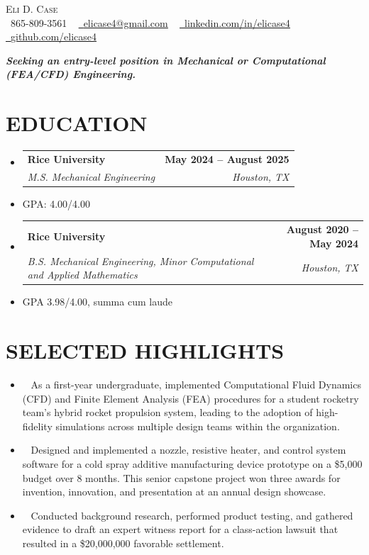 \documentclass[letterpaper,11pt]{article}
\makeatletter
\newcommand{\resumeItem}[1]{
  \item \small{
    {#1 \vspace{-2pt}}
  }
}
\newcommand{\highlightItem}[1]{
  \item \textendash\ \small{
    {#1 \vspace{-2pt}}
  }
}
\newcommand{\resumeSubheading}[4]{
  \vspace{-2pt}\item
    \begin{tabular*}{1.0\textwidth}[t]{l@{\extracolsep{\fill}}r}
      \textbf{#1} & \textbf{\small #2} \\
      \textit{\small#3} & \textit{\small #4} \\
    \end{tabular*}\vspace{-7pt}
}
\newcommand{\resumeSubHeadingListStart}{\begin{itemize}[leftmargin=0.0in, label={}]}
\newcommand{\resumeSubHeadingListEnd}{\end{itemize}}
\makeatother
\begin{document}
\begin{center}
    {\large \scshape Eli D. Case} \\ \vspace{1pt}
    \small \raisebox{-0.1\height}\faPhone\ 865-809-3561 ~ \href{mailto:elicase4@gmail.com}{\raisebox{-0.2\height}\faEnvelope\  \underline{elicase4@gmail.com}} ~ 
    \href{https://linkedin.com/in/elicase4}{\raisebox{-0.2\height}\faLinkedin\ \underline{linkedin.com/in/elicase4}}  ~
    \href{https://github.com/elicase4}{\raisebox{-0.2\height}\faGithub\ \underline{github.com/elicase4}}
\end{center}

\begin{center}
  \vspace{4pt}
  \textit{\textbf{Seeking an entry-level position in Mechanical or Computational (FEA/CFD) Engineering.}}
  \vspace{-2pt}
\end{center}

\section{EDUCATION}

  \resumeSubHeadingListStart
    
    \resumeSubheading
      {Rice University}{May 2024 -- August 2025}
      {M.S. Mechanical Engineering}{Houston, TX}
      \resumeItem{GPA: 4.00/4.00}
    \resumeSubheading
      {Rice University}{August 2020 -- May 2024}
      {B.S. Mechanical Engineering, Minor Computational and Applied Mathematics}{Houston, TX}
      \resumeItem{GPA 3.98/4.00, summa cum laude}

  \resumeSubHeadingListEnd
\vspace{-10pt}

\section{SELECTED HIGHLIGHTS}
 \begin{itemize}[leftmargin=0.15in, label={}]
    \highlightItem{As a first-year undergraduate, implemented Computational Fluid Dynamics (CFD) and Finite Element Analysis (FEA) procedures for a student rocketry team's hybrid rocket propulsion system, leading to the adoption of high-fidelity simulations across multiple design teams within the organization.}

    \highlightItem{Designed and implemented a nozzle, resistive heater, and control system software for a cold spray additive manufacturing device prototype on a \$5,000 budget over 8 months. This senior capstone project won three awards for invention, innovation, and presentation at an annual design showcase.}

    \highlightItem{Conducted background research, performed product testing, and gathered evidence to draft an expert witness report for a class-action lawsuit that resulted in a \$20,000,000 favorable settlement.} 
    
\end{itemize}
\vspace{-10pt}
\end{document}
